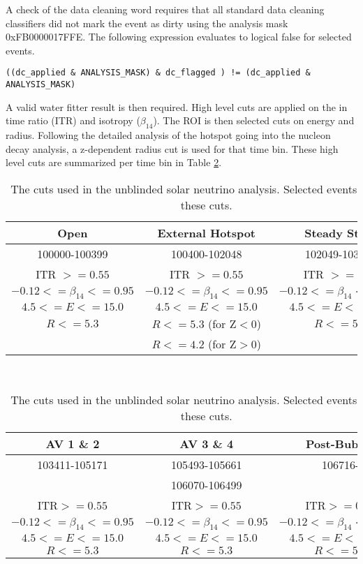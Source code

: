 A check of the data cleaning word requires that all standard data cleaning
classifiers did not mark the event as dirty using the analysis mask 
0xFB0000017FFE.
The following expression evaluates to logical false for selected events.

\begin{verbatim}
((dc_applied & ANALYSIS_MASK) & dc_flagged ) != (dc_applied & ANALYSIS_MASK)
\end{verbatim}

A valid water fitter result is then required.
High level cuts are applied on the in time ratio (ITR) and isotropy ($\beta_{14}$).
The ROI is then selected cuts on energy and radius.
Following the detailed analysis of the hotspot going into the nucleon decay
analysis, a z-dependent radius cut is used for that time bin.
These high level cuts are summarized per time bin in Table \ref{tbl:solar:unblind_roi}.

\begin{table}[]
\begin{center}
\begin{tabular}{c|c|c}
Open & External Hotspot & Steady State  \\ \hline
100000-100399 & 100400-102048 & 102049-103402 \\ \hline
ITR $ >= 0.55$ & ITR $ >= 0.55$ & ITR $ >= 0.55$ \\
$-0.12 <= \beta_{14} <= 0.95$ & $-0.12 <= \beta_{14} <= 0.95$ & $-0.12 <= \beta_{14} <= 0.95$ \\
$4.5 <= E <= 15.0$ & $4.5 <= E <= 15.0$ & $4.5 <= E <= 15.0$ \\
$R <= 5.3$ & $R <= 5.3$ (for Z$<$0) & $R <= 5.3$ \\
 & $R <= 4.2$ (for Z$>$0) & \\
\end{tabular}
\\[2\baselineskip]
\begin{tabular}{c|c|c}
AV 1 \& 2 & AV 3 \& 4 & Post-Bubble \\ \hline
103411-105171 & 105493-105661 & 106716- \\
& 106070-106499 & \\ \hline
ITR$ >= 0.55$ & ITR$ >= 0.55$ & ITR$ >= 0.55$ \\
$-0.12 <= \beta_{14} <= 0.95$ & $-0.12 <= \beta_{14} <= 0.95$ & $-0.12 <= \beta_{14} <= 0.95$ \\
$4.5 <= E <= 15.0$ & $4.5 <= E <= 15.0$ & $4.5 <= E <= 15.0$ \\
$R <= 5.3$ & $R <= 5.3$ & $R <= 5.3$ \\
\end{tabular}
\caption{The cuts used in the unblinded solar neutrino analysis. Selected events will pass these cuts.}
\label{tbl:solar:unblind_roi}
\end{center}
\end{table}

